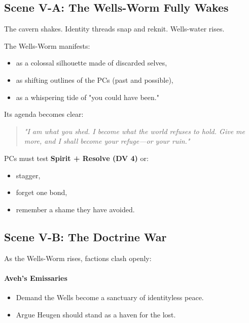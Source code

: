 \documentclass[11pt]{book}
\begin{document}
\subsection*{Scene V-A: The Wells-Worm Fully Wakes}

The cavern shakes. Identity threads snap and reknit. Wells-water rises.

The Wells-Worm manifests:
\begin{itemize}[leftmargin=*]
    \item as a colossal silhouette made of discarded selves,
    \item as shifting outlines of the PCs (past and possible),
    \item as a whispering tide of "you could have been."
\end{itemize}

Its agenda becomes clear:
\begin{quote}
\emph{"I am what you shed. I become what the world refuses to hold.
Give me more, and I shall become your refuge---or your ruin."}
\end{quote}

PCs must test \textbf{Spirit + Resolve (DV 4)} or:
\begin{itemize}
    \item stagger,
    \item forget one bond,
    \item remember a shame they have avoided.
\end{itemize}

\subsection*{Scene V-B: The Doctrine War}

As the Wells-Worm rises, factions clash openly:

\paragraph{Aveh's Emissaries}
\begin{itemize}
    \item Demand the Wells become a sanctuary of identityless peace.
    \item Argue Heugen should stand as a haven for the lost.
\end{itemize}
\end{document}
